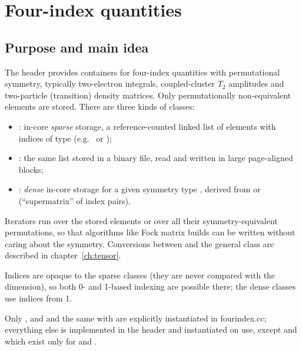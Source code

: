 \chapter{Four-index quantities}\label{ch:fourindex}


\section{Purpose and main idea}\label{sec:fourindex:purpose}

The header provides containers for four-index quantities with permutational symmetry, typically
two-electron integrals, coupled-cluster $T_2$ amplitudes and two-particle (transition) density matrices.
Only permutationally non-equivalent elements are stored. There are three kinds of classes:
\begin{itemize}
\item {}: in-core \emph{sparse} storage, a reference-counted linked list of
	elements  with indices of type  (e.g.\  or );
\item {}: the same list stored in a binary file, read and written in large
	page-aligned blocks;
\item {}: \emph{dense} in-core storage for a given symmetry type ,
	derived from  or  (``supermatrix'' of index pairs).
\end{itemize}
Iterators run over the stored elements or over all their symmetry-equivalent permutations, so that
algorithms like Fock matrix builds can be written without caring about the symmetry.
Conversions between  and the general  class are described in
chapter~\ref{ch:tensor}.

Indices are opaque to the sparse classes (they are never compared with the dimension), so both 0- and
1-based indexing are possible there; the dense classes use indices from 1.

Only ,  and
 and the same with  are explicitly instantiated in fourindex.cc;
everything else is implemented in the header and instantiated on use, except  and
 which exist only for  and .

